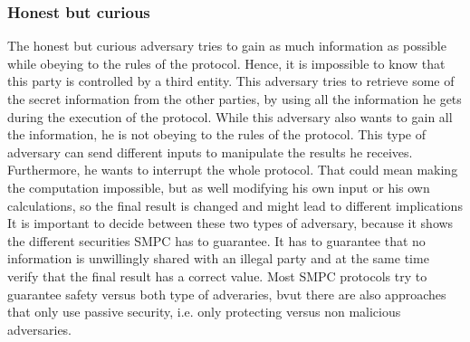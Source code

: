 \documentclass[english,runningheads,a4paper]{llncs}[2018/03/10]
\begin{document}
\subsubsection{Honest but curious}
The honest but curious adversary tries to gain as much information as possible while obeying to the rules of the protocol. Hence, it is impossible to know that this party is controlled by a third entity. This adversary tries to retrieve some of the secret information from the other parties, by using all the information he gets during the execution of the protocol.
While this adversary also wants to gain all the information, he is not obeying to the rules of the protocol. This type of adversary can send different inputs to manipulate the results he receives. Furthermore, he wants to interrupt the whole protocol. That could mean making the computation impossible, but as well modifying his own input or his own calculations, so the final result is changed and might lead to different implications
It is important to decide between these two types of adversary, because it shows the different securities SMPC has to guarantee. It has to guarantee that no information is unwillingly shared with an illegal party and at the same time verify that the final result has a correct value. Most SMPC protocols try to guarantee safety versus both type of adveraries, bvut there are also approaches that only use passive security, i.e. only protecting versus non malicious adversaries.
\end{document}
